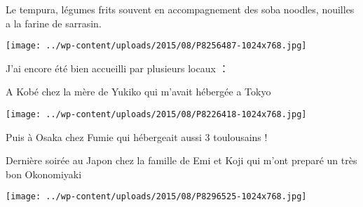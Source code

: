  

 Le tempura, légumes frits souvent en accompagnement des soba noodles, nouilles a la farine de sarrasin. 

 

\begin{center} \texttt{[image: ../wp-content/uploads/2015/08/P8256487-1024x768.jpg]} \end{center}

 

 J'ai encore été bien accueilli par plusieurs locaux ： 

 A Kobé chez la mère de Yukiko qui m'avait hébergée a Tokyo 

 

\begin{center} \texttt{[image: ../wp-content/uploads/2015/08/P8226418-1024x768.jpg]} \end{center}

 

 Puis à Osaka chez Fumie qui hébergeait aussi 3 toulousains ! 

 Dernière soirée au Japon chez la famille de Emi et Koji qui m'ont preparé un très bon Okonomiyaki 

 

\begin{center} \texttt{[image: ../wp-content/uploads/2015/08/P8296525-1024x768.jpg]} \end{center}




 
 
